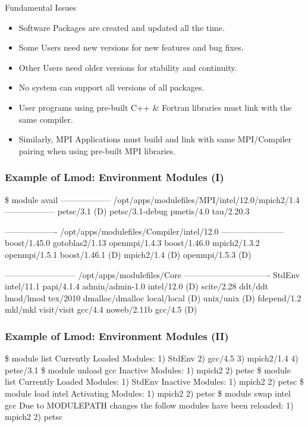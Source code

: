 \documentclass{beamer}
\begin{document}
\begin{frame}{Fundamental Issues}
  \begin{itemize}
    \item Software Packages are created and updated all the time.
    \item Some Users need new versions for new features and bug fixes.
    \item Other Users need older versions for stability and continuity.
    \item No system can support all versions of all packages.
    \item User programs using pre-built C++ \& Fortran libraries must link with the same compiler.
    \item Similarly, MPI Applications must build and link with same
      MPI/Compiler pairing when using pre-built MPI libraries.
  \end{itemize}
\end{frame}

\begin{frame}[fragile]
    \frametitle{Example of Lmod: Environment Modules (I)}
    {\tiny
\begin{semiverbatim}
\$ {\color{blue} module avail}
------------------ /opt/apps/modulefiles/MPI/intel/12.0/mpich2/1.4 ------------------
  petsc/3.1 (D)    petsc/3.1-debug    pmetis/4.0    tau/2.20.3

------------------- /opt/apps/modulefiles/Compiler/intel/12.0 -----------------------
  boost/1.45.0        gotoblas2/1.13      openmpi/1.4.3
  boost/1.46.0        mpich2/1.3.2        openmpi/1.5.1
  boost/1.46.1 (D)    mpich2/1.4    (D)   openmpi/1.5.3   (D)

-------------------------- /opt/apps/modulefiles/Core -------------------------------
  StdEnv               intel/11.1         papi/4.1.4
  admin/admin-1.0      intel/12.0  (D)    scite/2.28
  ddt/ddt              lmod/lmod          tex/2010
  dmalloc/dmalloc      local/local (D)    unix/unix    (D)
  fdepend/1.2          mkl/mkl            visit/visit
  gcc/4.4              noweb/2.11b
  gcc/4.5        (D)
\end{semiverbatim}
    }
\end{frame}

\begin{frame}[fragile]
    \frametitle{Example of Lmod: Environment Modules (II)}
    {\tiny
\begin{semiverbatim}
{\color{blue}\$ module list}
Currently Loaded Modules:
  1) StdEnv  2) gcc/4.5  3) mpich2/1.4  4) petsc/3.1
{\color{blue}\$ module unload gcc}
Inactive Modules:
  1) mpich2  2) petsc
{\color{blue}\$ module list}
Currently Loaded Modules:
  1) StdEnv
Inactive Modules:
  1) mpich2  2) petsc
{\color{blue}\$ module load intel}
Activating Modules:
  1) mpich2  2) petsc
{\color{blue}\$ module swap intel gcc}
Due to MODULEPATH changes the follow modules have been reloaded:
  1) mpich2  2) petsc
\end{semiverbatim}
    }
\end{frame}
\end{document}
